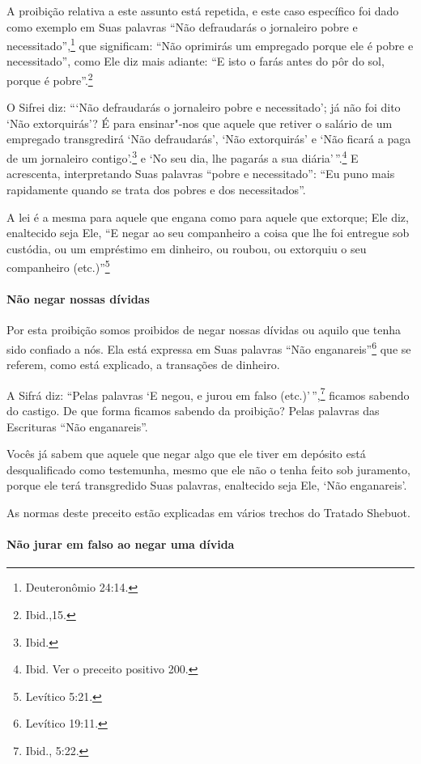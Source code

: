 \begin{multicols}{2}
A proibição relativa a este assunto está repetida, e este caso
específico foi dado como exemplo em Suas palavras ``Não defraudarás o
jornaleiro pobre e necessitado'',\footnote{Deuteronômio 24:14.} que significam:
``Não oprimirás um empregado porque ele é pobre e necessitado'', como
Ele diz mais adiante: ``E isto o farás antes do pôr do sol, porque é
pobre''.\footnote{Ibid.,15.}

O Sifrei\starr{} diz: ```Não defraudarás o jornaleiro pobre e necessitado'; já
não foi dito `Não extorquirás'? É para ensinar"-nos que aquele que
retiver o salário de um empregado transgredirá `Não defraudarás', `Não
extorquirás' e `Não ficará a paga de um jornaleiro contigo'.\footnote{Ibid.} e
`No seu dia, lhe pagarás a sua diária'\,''.\footnote{Ibid. Ver o preceito positivo 200.} E acrescenta, interpretando Suas
palavras ``pobre e necessitado'': ``Eu puno mais rapidamente quando se
trata dos pobres e dos necessitados''.

A lei é a mesma para aquele que engana como para aquele que extorque;
Ele diz, enaltecido seja Ele, ``E negar ao seu companheiro a coisa que
lhe foi entregue sob custódia, ou um empréstimo em dinheiro, ou roubou,
ou extorquiu o seu companheiro (etc.)''\footnote{Levítico 5:21.}

\paragraph{Não negar nossas dívidas}

Por esta proibição somos proibidos de negar nossas dívidas ou aquilo
que tenha sido confiado a nós. Ela está expressa em Suas palavras ``Não
enganareis''\footnote{Levítico 19:11.} que se referem, como está explicado, a
transações de dinheiro.

A Sifrá\starr{} diz: ``Pelas palavras `E negou, e jurou em falso (etc.)'\,'',\footnote{Ibid., 5:22.} ficamos sabendo do castigo. De que forma ficamos sabendo
da proibição? Pelas palavras das Escrituras ``Não enganareis''.

Vocês já sabem que aquele que negar algo que ele tiver em depósito está
desqualificado como testemunha, mesmo que ele não o tenha feito sob
juramento, porque ele terá transgredido Suas palavras, enaltecido seja
Ele, `Não enganareis'.

As normas deste preceito estão explicadas em vários trechos do Tratado
Shebuot\starr.

\paragraph{Não jurar em falso ao negar uma dívida}


\end{multicols}
